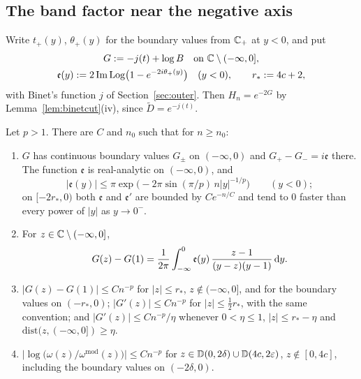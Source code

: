 \subsection{The band factor near the negative axis}\label{sec:classical-band}

Write $t_+(y)$, $\theta_+(y)$ for the boundary values from $\mathbb{C}_+$ at $y<0$, and put
\begin{equation}\label{eq:G-def}
\begin{gathered}
  G:=-j(t)+\log B\quad\text{on }\mathbb{C}\setminus(-\infty,0],\\
  \mathfrak e(y):=2\operatorname{Im}\operatorname{Log}\bigl(1-e^{-2i\theta_+(y)}\bigr)\quad(y<0),\qquad r_*:=4c+2,
\end{gathered}
\end{equation}
with Binet's function $j$ of Section~\ref{sec:outer}. Then $H_n=e^{-2G}$ by Lemma~\ref{lem:binetcut}(iv), since
$\tilde D=e^{-j(t)}$.

\begin{lemma}\label{lem:bandfactor}
Let $p>1$. There are $C$ and $n_0$ such that for $n\ge n_0$:
\begin{enumerate}
\item[(i)] $G$ has continuous boundary values $G_\pm$ on $(-\infty,0)$ and $G_+-G_-=i\mathfrak e$ there. The function
  $\mathfrak e$ is real-analytic on $(-\infty,0)$, and
  \[
    |\mathfrak e(y)|\le\pi\exp\bigl(-2\pi\sin(\pi/p)\,n|y|^{-1/p}\bigr)\qquad(y<0);
  \]
  on $[-2r_*,0)$ both $\mathfrak e$ and $\mathfrak e'$ are bounded by $Ce^{-n/C}$ and tend to $0$ faster than every
  power of $|y|$ as $y\to0^-$.
\item[(ii)] For $z\in\mathbb{C}\setminus(-\infty,0]$,
  \begin{equation}\label{eq:G-repr}
    G(z)-G(1)=\frac1{2\pi}\int_{-\infty}^0\mathfrak e(y)\,\frac{z-1}{(y-z)(y-1)}\,\mathrm{d} y .
  \end{equation}
\item[(iii)] $|G(z)-G(1)|\le Cn^{-p}$ for $|z|\le r_*$, $z\notin(-\infty,0]$, and for the boundary values on $(-r_*,0)$;
  $|G'(z)|\le Cn^{-p}$ for $|z|\le\frac12r_*$, with the same convention; and $|G'(z)|\le Cn^{-p}/\eta$ whenever
  $0<\eta\le1$, $|z|\le r_*-\eta$ and $\mathrm{dist}(z,(-\infty,0])\ge\eta$.
\item[(iv)] $\bigl|\log\bigl(\omega(z)/\omega^{\mathrm{mod}}(z)\bigr)\bigr|\le Cn^{-p}$ for $z\in \mathbb D(0,2\delta)\cup
  \mathbb D(4c,2\varepsilon)$, $z\notin[0,4c]$, including the boundary values on $(-2\delta,0)$.
\end{enumerate}
\end{lemma}

